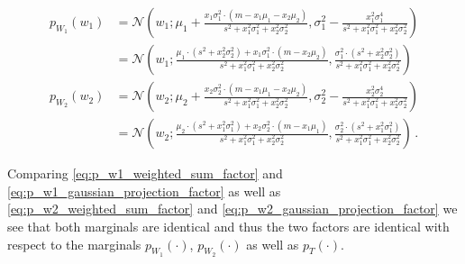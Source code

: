\documentclass[a4paper]{article}
\newcommand{\Normal}[3]{{\mathcal N} \left({#1};{#2},{#3}\right)}
\theoremstyle{definition}
\begin{document}
\begin{align}
    p_{W_1}(w_1) & = \Normal{w_1}{\mu_1 + \frac{x_1 \sigma_1^2 \cdot \left( m - x_1 \mu_1 - x_2 \mu_2 \right)}{s^2 + x_1^2 \sigma_1^2 + x_2^2 \sigma_2^2}}{\sigma_1^2 - \frac{x_1^2 \sigma_1^4}{s^2 + x_1^2 \sigma_1^2 + x_2^2 \sigma_2^2}} \nonumber \\
    & = \Normal{w_1}{\frac{\mu_1 \cdot \left( s^2 +  x_2^2 \sigma_2^2 \right) + x_1 \sigma_1^2 \cdot \left( m - x_2 \mu_2 \right)}{s^2 + x_1^2 \sigma_1^2 + x_2^2 \sigma_2^2}}{\frac{\sigma_1^2 \cdot \left( s^2 + x_2^2 \sigma_2^2 \right)}{s^2 + x_1^2 \sigma_1^2 + x_2^2 \sigma_2^2}} \label{eq:p_w1_gaussian_projection_factor} \\
    p_{W_2}(w_2) & = \Normal{w_2}{\mu_2 + \frac{x_2 \sigma_2^2 \cdot \left( m - x_1 \mu_1 - x_2 \mu_2 \right)}{s^2 + x_1^2 \sigma_1^2 + x_2^2 \sigma_2^2}}{\sigma_2^2 - \frac{x_2^2 \sigma_2^4}{s^2 + x_1^2 \sigma_1^2 + x_2^2 \sigma_2^2}} \nonumber \\
    & = \Normal{w_2}{\frac{\mu_2 \cdot \left( s^2 + x_1^2 \sigma_1^2 \right) + x_2 \sigma_2^2 \cdot \left( m - x_1 \mu_1 \right)}{s^2 + x_1^2 \sigma_1^2 + x_2^2 \sigma_2^2}}{\frac{\sigma_2^2 \cdot \left( s^2 + x_1^2 \sigma_1^2  \right)}{s^2 + x_1^2 \sigma_1^2 + x_2^2 \sigma_2^2}} \label{eq:p_w2_gaussian_projection_factor} \,.
\end{align}

Comparing \eqref{eq:p_w1_weighted_sum_factor} and \eqref{eq:p_w1_gaussian_projection_factor} as well as \eqref{eq:p_w2_weighted_sum_factor} and \eqref{eq:p_w2_gaussian_projection_factor} we see that both marginals are identical and thus the two factors are identical with respect to the marginals $p_{W_1}(\cdot)$, $p_{W_2}(\cdot)$ as well as $p_T(\cdot)$.
\end{document}
